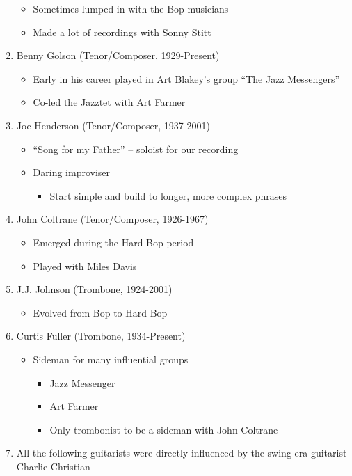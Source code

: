 \documentclass[]{article}
\providecommand{\tightlist}{%
  \setlength{\itemsep}{0pt}\setlength{\parskip}{0pt}}
\begin{document}
\begin{enumerate}
  \begin{itemize}
  \tightlist
  \item
    Sometimes lumped in with the Bop musicians
  \item
    Made a lot of recordings with Sonny Stitt
  \end{itemize}
\item
  Benny Golson (Tenor/Composer, 1929-Present)

  \begin{itemize}
  \tightlist
  \item
    Early in his career played in Art Blakey's group ``The Jazz
    Messengers''
  \item
    Co-led the Jazztet with Art Farmer
  \end{itemize}
\item
  Joe Henderson (Tenor/Composer, 1937-2001)

  \begin{itemize}
  \tightlist
  \item
    ``Song for my Father'' -- soloist for our recording
  \item
    Daring improviser

    \begin{itemize}
    \tightlist
    \item
      Start simple and build to longer, more complex phrases
    \end{itemize}
  \end{itemize}
\item
  John Coltrane (Tenor/Composer, 1926-1967)

  \begin{itemize}
  \tightlist
  \item
    Emerged during the Hard Bop period
  \item
    Played with Miles Davis
  \end{itemize}
\item
  J.J. Johnson (Trombone, 1924-2001)

  \begin{itemize}
  \tightlist
  \item
    Evolved from Bop to Hard Bop
  \end{itemize}
\item
  Curtis Fuller (Trombone, 1934-Present)

  \begin{itemize}
  \tightlist
  \item
    Sideman for many influential groups

    \begin{itemize}
    \tightlist
    \item
      Jazz Messenger
    \item
      Art Farmer
    \item
      Only trombonist to be a sideman with John Coltrane
    \end{itemize}
  \end{itemize}
\item
  All the following guitarists were directly influenced by the swing era
  guitarist Charlie Christian


\end{enumerate}
\end{document}
